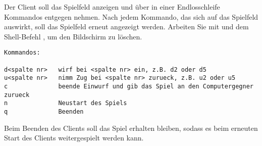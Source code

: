 Der Client soll das Spielfeld anzeigen und über  in einer
Endlosschleife Kommandos entgegen nehmen. Nach jedem Kommando, das sich auf das
Spielfeld auswirkt, soll das Spielfeld erneut angezeigt werden. Arbeiten Sie mit
 und dem Shell-Befehl , um den Bildschirm zu
löschen.

\begin{verbatim}
Kommandos:

d<spalte nr>   wirf bei <spalte nr> ein, z.B. d2 oder d5
u<spalte nr>   nimm Zug bei <spalte nr> zurueck, z.B. u2 oder u5
c              beende Einwurf und gib das Spiel an den Computergegner zurueck
n              Neustart des Spiels
q              Beenden
\end{verbatim}

Beim Beenden des Clients soll das Spiel erhalten bleiben, sodass es beim
erneuten Start des Clients weitergespielt werden kann.

\osueguidelinesthree


